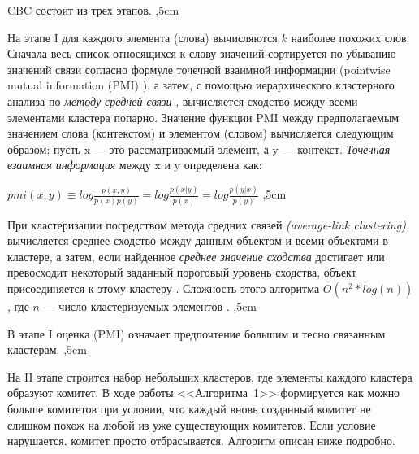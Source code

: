 \documentclass{article}
\begin{document}
\begin{articletext}
CBC состоит из трех этапов.
,5cm

На этапе I для каждого элемента (слова) вычисляются $k$ наиболее похожих слов. Сначала весь список относящихся к слову значений сортируется по убыванию значений связи согласно формуле точечной взаимной информации (pointwise mutual information (PMI) \cite{Manning 1999}), а затем, с помощью иерархического кластерного анализа по \textit{методу средней связи} \cite{Kim 1989}, вычисляется сходство между всеми элементами кластера попарно. Значение функции PMI \cite{Manning 1999} между предполагаемым значением слова (контекстом) и элементом (словом) вычисляется следующим образом: пусть x --- это рассматриваемый элемент, а y --- контекст. \textit{Точечная взаимная информация} между x и y определена как:

$pmi(x;y)\equiv log \frac{p(x,y)}{p(x)p(y)}=log\frac{p(x|y)}{p(x)}=log\frac{p(y|x)}{p(y)}$
,5cm

При кластеризации посредством метода средних связей \textit{(average-link clustering)} вычисляется среднее сходство между данным объектом и всеми объектами в кластере, а затем, если найденное \textit{среднее значение сходства} достигает или превосходит некоторый заданный пороговый уровень сходства, объект присоединяется к этому кластеру \cite{Kim 1989}. Сложность этого алгоритма $O(n^2 * log (n))$, где $n$ --- число кластеризуемых элементов \cite{Jain 1999}.
,5cm

В этапе I оценка (PMI) означает предпочтение большим и тесно связанным кластерам.
,5cm

На II этапе строится набор небольших кластеров, где элементы каждого кластера образуют комитет. В ходе работы <<Алгоритма~1>> формируется как можно больше комитетов при условии, что каждый вновь созданный комитет не слишком похож на любой из уже существующих комитетов. Если условие нарушается, комитет просто отбрасывается. Алгоритм описан ниже подробно.


\end{articletext}
\end{document}
